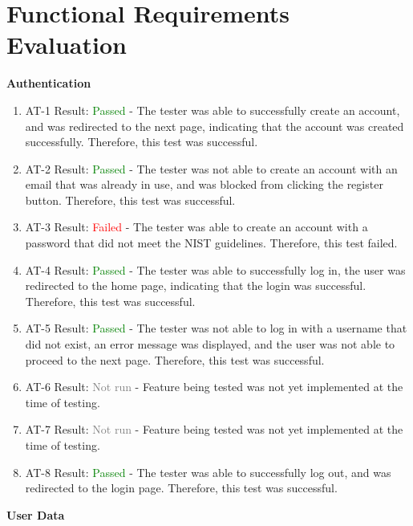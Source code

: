\documentclass[12pt, titlepage]{article}
\begin{document}
\section{Functional Requirements Evaluation}

\noindent\large{\textbf{Authentication}}

\normalsize

\begin{enumerate}
  \item AT-1
  Result: \textcolor{green}{Passed} - The tester was able to successfully create an account, and was redirected to the next page, 
  indicating that the account was created successfully. Therefore, this test was successful.
  \item AT-2
  Result: \textcolor{green}{Passed} - The tester was not able to create an account with an email that was already in use, 
  and was blocked from clicking the register button. Therefore, this test was successful.
  \item AT-3
  Result: \textcolor{red}{Failed} - The tester was able to create an account with a password that did not meet the NIST guidelines. 
  Therefore, this test failed.
  \item AT-4
  Result: \textcolor{green}{Passed} - The tester was able to successfully log in, the user was redirected to the home page, 
  indicating that the login was successful. Therefore, this test was successful.
  \item AT-5
  Result: \textcolor{green}{Passed} - The tester was not able to log in with a username that did not exist, an error message was displayed,
  and the user was not able to proceed to the next page. Therefore, this test was successful.
  \item AT-6
  Result: \textcolor{gray}{Not run} - Feature being tested was not yet implemented at the time of testing.
  \item AT-7
  Result: \textcolor{gray}{Not run} - Feature being tested was not yet implemented at the time of testing.
  \item AT-8
  Result: \textcolor{green}{Passed} - The tester was able to successfully log out, and was redirected to the login page. 
  Therefore, this test was successful.
\end{enumerate}

\noindent\large{\textbf{User Data}}

\normalsize
\end{document}
